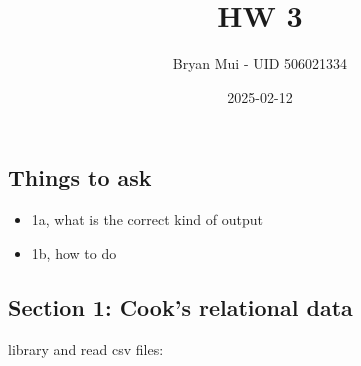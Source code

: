 \documentclass[
]{article}
\title{HW 3}
\author{Bryan Mui - UID 506021334}
\date{2025-02-12}
\providecommand{\tightlist}{%
  \setlength{\itemsep}{0pt}\setlength{\parskip}{0pt}}
\begin{document}
\maketitle

\subsection{\texorpdfstring{Things to ask
\n}{Things to ask }}\label{things-to-ask}

\begin{itemize}
\tightlist
\item
  1a, what is the correct kind of output
\item
  1b, how to do
\end{itemize}

\subsection{Section 1: Cook's relational
data}\label{section-1-cooks-relational-data}

library and read csv files:
\end{document}
